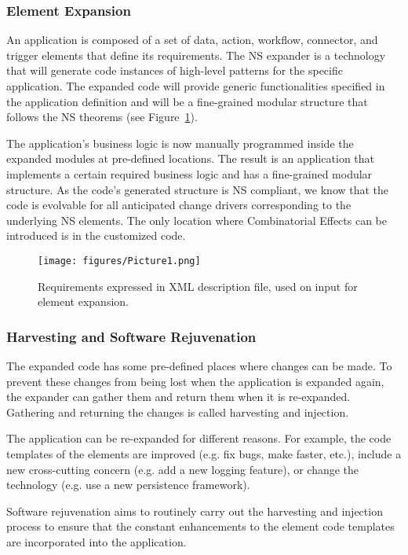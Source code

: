 \subsubsection{Element Expansion}\label{Element Expansion} An application is composed of a
set of data, action, workflow, connector, and trigger elements that define its
requirements. The NS expander is a technology that will generate code instances of
high-level patterns for the specific application. The expanded code will provide generic
functionalities specified in the application definition and will be a fine-grained modular
structure that follows the NS theorems (see Figure~\ref{fig_1}).

The application's business logic is now manually programmed inside the expanded modules at
pre-defined locations. The result is an application that implements a certain required
business logic and has a fine-grained modular structure. As the code's generated structure
is NS compliant, we know that the code is evolvable for all anticipated change drivers
corresponding to the underlying NS elements. The only location where Combinatorial Effects
can be introduced is in the customized code.
\begin{figure}[htbp]
\centering
\centerline{\texttt{[image: figures/Picture1.png]}}
\caption{Requirements expressed in XML description file, used on input for element expansion.}
\label{fig_1}
\end{figure}

%
%
\subsubsection{Harvesting and Software Rejuvenation}\label{Harvesting and Software
Rejuvenation} The expanded code has some pre-defined places where changes can be made. To
prevent these changes from being lost when the application is expanded again, the expander
can gather them and return them when it is re-expanded. Gathering and returning the
changes is called harvesting and injection.

The application can be re-expanded for different reasons. For example, the code templates
of the elements are improved (e.g. fix bugs, make faster, etc.), include a new cross-cutting
concern (e.g. add a new logging feature), or change the technology (e.g. use a new persistence
framework).

Software rejuvenation aims to routinely carry out the harvesting and injection process to
ensure that the constant enhancements to the element code templates are incorporated into
the application.

